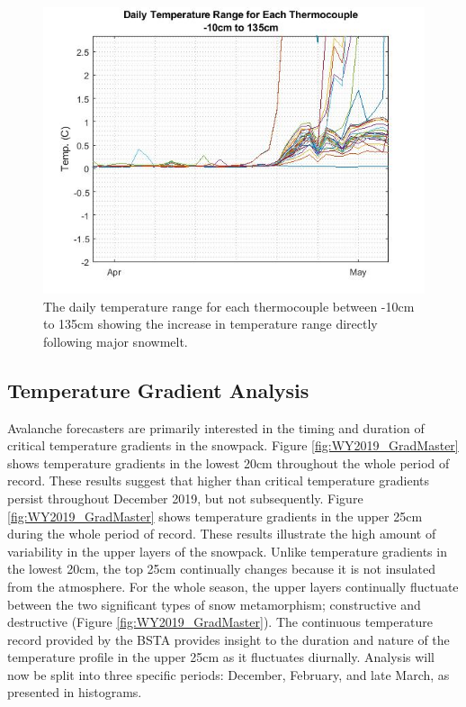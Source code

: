  \begin{figure}[H]
    \centering
    \includegraphics[width=0.8\linewidth]{figures/DailyTempRange_Isotherm.jpg}
    \caption{The daily temperature range for each thermocouple between -10cm to 135cm showing the increase in temperature range directly following major snowmelt.}
    \label{fig:DailyTempRange}
 \end{figure}
 
\subsection{Temperature Gradient Analysis}
Avalanche forecasters are primarily interested in the timing and duration of critical temperature gradients in the snowpack. Figure \ref{fig:WY2019_GradMaster} shows temperature gradients in the lowest 20cm throughout the whole period of record. These results suggest that higher than critical temperature gradients persist throughout December 2019, but not subsequently. Figure \ref{fig:WY2019_GradMaster} shows temperature gradients in the upper 25cm during the whole period of record. These results illustrate the high amount of variability in the upper layers of the snowpack. Unlike temperature gradients in the lowest 20cm, the top 25cm continually changes because it is not insulated from the atmosphere. For the whole season, the upper layers continually fluctuate between the two significant types of snow metamorphism; constructive and destructive (Figure \ref{fig:WY2019_GradMaster}). The continuous temperature record provided by the BSTA provides insight to the duration and nature of the temperature profile in the upper 25cm as it fluctuates diurnally. Analysis will now be split into three specific periods: December, February, and late March, as presented in histograms. 

